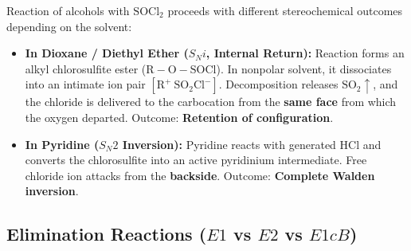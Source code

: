 \documentclass[10pt,twoside,openright]{book}
\begin{document}
\begin{conceptbox}
Reaction of alcohols with $\mathrm{SOCl_2}$ proceeds with different stereochemical outcomes depending on the solvent:
\begin{itemize}
  \item \textbf{In Dioxane / Diethyl Ether ($S_Ni$, Internal Return):} Reaction forms an alkyl chlorosulfite ester ($\mathrm{R-O-SOCl}$). In nonpolar solvent, it dissociates into an intimate ion pair $[\mathrm{R}^+\ \mathrm{SO_2Cl}^-]$. Decomposition releases $\mathrm{SO_2}\uparrow$, and the chloride is delivered to the carbocation from the \textbf{same face} from which the oxygen departed. Outcome: \textbf{Retention of configuration}.
  \item \textbf{In Pyridine ($S_N2$ Inversion):} Pyridine reacts with generated $\mathrm{HCl}$ and converts the chlorosulfite into an active pyridinium intermediate. Free chloride ion attacks from the \textbf{backside}. Outcome: \textbf{Complete Walden inversion}.
\end{itemize}
\end{conceptbox}

\subsection{Elimination Reactions (\texorpdfstring{$E1$}{E1} vs \texorpdfstring{$E2$}{E2} vs \texorpdfstring{$E1cB$}{E1cB})}
\end{document}
